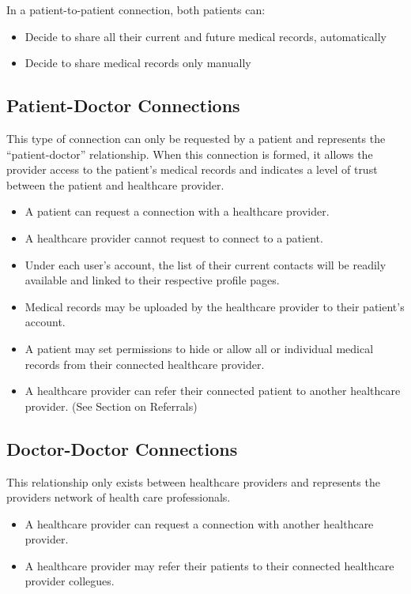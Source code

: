 In a patient-to-patient connection, both patients can:
\begin{itemize}
\item Decide to share all their current and future medical records, automatically
\item Decide to share medical records only manually
\end{itemize}

\subsection{Patient-Doctor Connections}
This type of connection can only be requested by a patient and represents the ``patient-doctor'' relationship.  When this connection is formed, it allows the provider access to the patient's medical records and indicates a level of trust between the patient and healthcare provider.
\begin{itemize}
\item A patient can request a connection with a healthcare provider. 
\item A healthcare provider cannot request to connect to a patient. 
\item Under each user's account, the list of their current contacts will be readily available and linked to their respective profile pages.
\item Medical records may be uploaded by the healthcare provider to their patient's account. 
\item A patient may set permissions to hide or allow all or individual medical records from their connected healthcare provider. 
\item A healthcare provider can refer their connected patient to another healthcare provider. (See Section on Referrals)
\end{itemize} 

\subsection{Doctor-Doctor Connections}
This relationship only exists between healthcare providers and represents the providers network of health care professionals.
\begin{itemize}
\item A healthcare provider can request a connection with another healthcare provider. 
\item A healthcare provider may refer their patients to their connected healthcare provider collegues. 
\end{itemize} 

